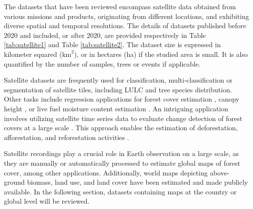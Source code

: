 \documentclass{CUP-JNL-DTM}%
\theoremstyle{definition}
\numberwithin{equation}{section}
\begin{document}

The datasets that have been reviewed encompass satellite data obtained from various missions and products, originating from different locations, and exhibiting diverse spatial and temporal resolutions.
The details of datasets published before 2020 and included, or after 2020, are provided respectively in Table \ref{tab:satellite1} and Table \ref{tab:satellite2}.
The dataset size is expressed in kilometer squared ($\text{km}^2$), or in hectares (ha) if the studied area is small. It is also quantified by the number of samples, trees or events if applicable.

Satellite datasets are frequently used for classification, multi-classification or segmentation of satellite tiles, including LULC and tree species distribution.
Other tasks include regression applications for forest cover estimation \cite{bastani_satlas_2022, feng_m_arctic-boreal_2022}, canopy height \cite{forkuor_above-ground_2020, lang_high-resolution_2022}, or live fuel moisture content estimation \cite{rao_sar-enhanced_2020}.
An intriguing application involves utilizing satellite time series data to evaluate change detection of forest covers at a large scale \cite{wang_extensive_2020}. This approach enables the estimation of deforestation, afforestation, and reforestation activities \cite{potapov_global_2022}.

Satellite recordings play a crucial role in Earth observation on a large scale, as they are manually or automatically processed to estimate global maps of forest cover, among other applications. Additionally, world maps depicting above-ground biomass, land use, and land cover have been estimated and made publicly available. In the following section, datasets containing maps at the country or global level will be reviewed.
\end{document}
